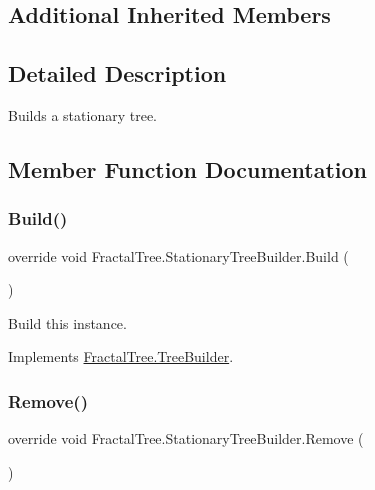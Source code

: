 \subsection*{Additional Inherited Members}


\subsection{Detailed Description}
Builds a stationary tree. 



\subsection{Member Function Documentation}
\mbox{\label{class_fractal_tree_1_1_stationary_tree_builder_ab11cfafdc3a0e6c29fe4eef3318331b7}} 
\subsubsection{\texorpdfstring{Build()}{Build()}}
{\footnotesize\ttfamily override void Fractal\+Tree.\+Stationary\+Tree\+Builder.\+Build (\begin{DoxyParamCaption}{ }\end{DoxyParamCaption})\hspace{0.3cm}{\ttfamily [virtual]}}



Build this instance. 



Implements \hyperlink{class_fractal_tree_1_1_tree_builder}{Fractal\+Tree.\+Tree\+Builder}.

\mbox{\label{class_fractal_tree_1_1_stationary_tree_builder_a6f7254b5a4ef6ebbdd88abadfc221b4c}} 
\subsubsection{\texorpdfstring{Remove()}{Remove()}}
{\footnotesize\ttfamily override void Fractal\+Tree.\+Stationary\+Tree\+Builder.\+Remove (\begin{DoxyParamCaption}{ }\end{DoxyParamCaption})\hspace{0.3cm}{\ttfamily [virtual]}}



